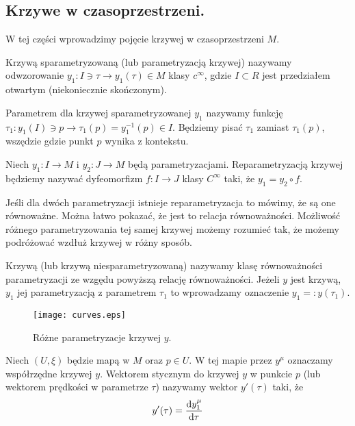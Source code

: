 \subsection{Krzywe w czasoprzestrzeni.}
W tej części wprowadzimy pojęcie krzywej w czasoprzestrzeni $M$.
\begin{definition}
Krzywą sparametryzowaną (lub parametryzacją krzywej) nazywamy 
odwzorowanie 
$ y_1 : I \ni \tau \to y_1(\tau) \in M$ klasy $c^\infty$, 
gdzie $I \subset R$ 
jest przedziałem otwartym (niekoniecznie skończonym).
\end{definition}
\begin{definition}
Parametrem dla krzywej sparametryzowanej $y_1$ 
nazywamy funkcję $ \tau_1: y_1(I) \ni p 
\to \tau_1(p) = y_1^{-1}( p )\in I$. 
Będziemy pisać
$\tau_1$ zamiast $\tau_1(p)$, wszędzie gdzie punkt $p$ 
wynika z kontekstu.
\end{definition}
\begin{definition}
Niech $y_1: I \to M$ i $y_2:J\to M$ będą parametryzacjami.
Reparametryzacją krzywej będziemy nazywać dyfeomorfizm $f : I \to J$
klasy $C^\infty$
taki, że $y_1 = y_2 \circ f$.
\end{definition}
Jeśli dla dwóch parametryzacji istnieje reparametryzacja to 
mówimy, że są one równoważne. Można łatwo pokazać, że jest to
relacja równoważności. Możliwość różnego parametryzowania tej 
samej krzywej możemy rozumieć tak, że możemy podróżować wzdłuż
krzywej w różny sposób.
\begin{definition}
Krzywą (lub krzywą niesparametryzowaną) nazywamy klasę równoważności
parametryzacji ze wzgędu powyższą relację równoważności.
Jeżeli $y$ jest krzywą, $y_1$ jej parametryzacją z parametrem $\tau_1$
to wprowadzamy oznaczenie $y_1 =: y(\tau_1)$.
\end{definition}
\begin{figure}
\centering
\texttt{[image: curves.eps]}
\caption{Różne parametryzacje krzywej $y$.}
\end{figure}
\begin{definition}
Niech $(U,\xi)$ będzie mapą w $M$ oraz $p\in U$. W tej mapie 
przez $y^\mu$ oznaczamy współrzędne krzywej $y$.
Wektorem stycznym do krzywej $y$ w punkcie $p$  
(lub wektorem prędkości w 
parametrze $\tau$) nazywamy wektor $y'(\tau)$ taki, że
\begin{align*}
y' (\tau )= \frac{\text{d} y_1^\mu }{\text{d} \tau}
\end{align*}
\end{definition}
